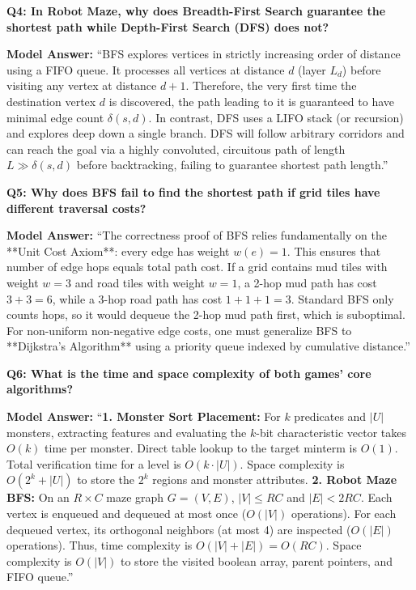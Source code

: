 \documentclass[11pt,a4paper]{article}
\theoremstyle{definition}
\begin{document}
\begin{vivabox}
\textbf{Q4: In Robot Maze, why does Breadth-First Search guarantee the shortest path while Depth-First Search (DFS) does not?}

\textbf{Model Answer:}
``BFS explores vertices in strictly increasing order of distance using a FIFO queue. It processes all vertices at distance $d$ (layer $L_d$) before visiting any vertex at distance $d+1$. Therefore, the very first time the destination vertex $d$ is discovered, the path leading to it is guaranteed to have minimal edge count $\delta(s, d)$. In contrast, DFS uses a LIFO stack (or recursion) and explores deep down a single branch. DFS will follow arbitrary corridors and can reach the goal via a highly convoluted, circuitous path of length $L \gg \delta(s, d)$ before backtracking, failing to guarantee shortest path length.''
\end{vivabox}

\begin{vivabox}
\textbf{Q5: Why does BFS fail to find the shortest path if grid tiles have different traversal costs?}

\textbf{Model Answer:}
``The correctness proof of BFS relies fundamentally on the **Unit Cost Axiom**: every edge has weight $w(e) = 1$. This ensures that number of edge hops equals total path cost. If a grid contains mud tiles with weight $w = 3$ and road tiles with weight $w = 1$, a 2-hop mud path has cost $3 + 3 = 6$, while a 3-hop road path has cost $1 + 1 + 1 = 3$. Standard BFS only counts hops, so it would dequeue the 2-hop mud path first, which is suboptimal. For non-uniform non-negative edge costs, one must generalize BFS to **Dijkstra's Algorithm** using a priority queue indexed by cumulative distance.''
\end{vivabox}

\begin{vivabox}
\textbf{Q6: What is the time and space complexity of both games' core algorithms?}

\textbf{Model Answer:}
``\textbf{1. Monster Sort Placement:} For $k$ predicates and $|U|$ monsters, extracting features and evaluating the $k$-bit characteristic vector takes $O(k)$ time per monster. Direct table lookup to the target minterm is $O(1)$. Total verification time for a level is $O(k \cdot |U|)$. Space complexity is $O(2^k + |U|)$ to store the $2^k$ regions and monster attributes.
\textbf{2. Robot Maze BFS:} On an $R \times C$ maze graph $G=(V, E)$, $|V| \le RC$ and $|E| < 2RC$. Each vertex is enqueued and dequeued at most once ($O(|V|)$ operations). For each dequeued vertex, its orthogonal neighbors (at most 4) are inspected ($O(|E|)$ operations). Thus, time complexity is $O(|V| + |E|) = O(RC)$. Space complexity is $O(|V|)$ to store the visited boolean array, parent pointers, and FIFO queue.''
\end{vivabox}
\end{document}
